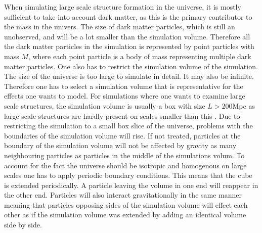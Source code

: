 When simulating large scale structure formation in the universe, it is mostly
sufficient to take into account dark matter, as this is the primary contributor
to the mass in the univers. The size of dark matter particles, which is still an
unobserved, and will be a lot smaller than the simulation volume. Therefore
all the dark matter particles in the simulation is represented by point
particles with mass $M$, where each point particle is a body of mass
representing multiple dark matter particles. One also has to restrict the
simulation volume of the simulation. The size of the universe is too large to
simulate in detail. It may also be infinite. Therefore one has to select a
simulation volume that is representative for the effects one wants to model. For
simulations where one wants to examine large scale structures, the simulation
volume is usually a box with size $L>200$Mpc as large scale structures are hardly present on
scales smaller than this \cite[p.~362]{schneider2006extragalactic}. Due to
restricting the simulation to a small box slice of the universe, problems with
the boundaries of the simulation volume will rise. If not treated, particles at
the boundary of the simulation volume will not be affected by gravity as many
neighbouring particles as particles in the middle of the simulations volum. To
account for the fact the universe should be isotropic and homogenous on large
scales one has to apply periodic boundary conditions. This means that the cube
is extended periodically. A particle leaving the volume in one end will reappear
in the other end. Particles will also interact gravitationally in the same
manner meaning that particles opposing sides of the simulation volume will
effect each other as if the simulation volume was extended by adding an
identical volume side by side.

